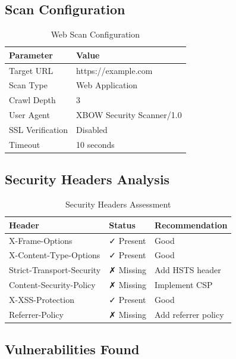\documentclass[12pt,a4paper]{report}
\begin{document}
\subsection{Scan Configuration}

\begin{table}[H]
    \centering
    \caption{Web Scan Configuration}
    \label{tab:web_scan_config}
    \begin{tabular}{@{}ll@{}}
        \toprule
        Parameter & Value \\
        \midrule
        Target URL & https://example.com \\
        Scan Type & Web Application \\
        Crawl Depth & 3 \\
        User Agent & XBOW Security Scanner/1.0 \\
        SSL Verification & Disabled \\
        Timeout & 10 seconds \\
        \bottomrule
    \end{tabular}
\end{table}

\subsection{Security Headers Analysis}

\begin{table}[H]
    \centering
    \caption{Security Headers Assessment}
    \label{tab:security_headers}
    \begin{tabular}{@{}lll@{}}
        \toprule
        Header & Status & Recommendation \\
        \midrule
        X-Frame-Options & ✓ Present & Good \\
        X-Content-Type-Options & ✓ Present & Good \\
        Strict-Transport-Security & ✗ Missing & Add HSTS header \\
        Content-Security-Policy & ✗ Missing & Implement CSP \\
        X-XSS-Protection & ✓ Present & Good \\
        Referrer-Policy & ✗ Missing & Add referrer policy \\
        \bottomrule
    \end{tabular}
\end{table}

\subsection{Vulnerabilities Found}
\end{document}
